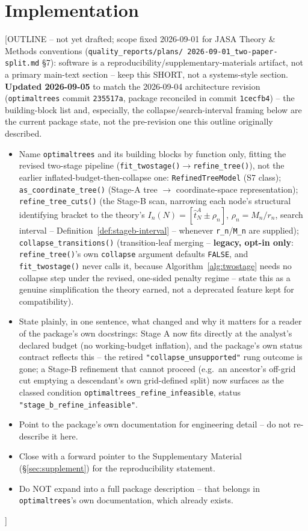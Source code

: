 \documentclass[11pt]{article}
\theoremstyle{plain}
\theoremstyle{definition}
\theoremstyle{remark}
\begin{document}
\section{Implementation}\label{sec:implementation}
[OUTLINE -- not yet drafted; scope fixed 2026-09-01 for JASA Theory \&
Methods conventions (\texttt{quality\_reports/plans/
2026-09-01\_two-paper-split.md} \S7): software is a
reproducibility/supplementary-materials artifact, not a primary main-text
section -- keep this SHORT, not a systems-style section. \textbf{Updated
2026-09-05} to match the 2026-09-04 architecture revision
(\texttt{optimaltrees} commit \texttt{235517a}, package reconciled in
commit \texttt{1cecfb4}) -- the building-block list and, especially, the
collapse/search-interval framing below are the current package state, not
the pre-revision one this outline originally described.
\begin{itemize}
\item Name \texttt{optimaltrees} and its building blocks by function only,
  fitting the revised two-stage pipeline
  (\texttt{fit\_twostage()}$\to$\texttt{refine\_tree()}), not the earlier
  inflated-budget-then-collapse one: \texttt{RefinedTreeModel} (S7 class);
  \texttt{as\_coordinate\_tree()} (Stage-A tree $\to$ coordinate-space
  representation); \texttt{refine\_tree\_cuts()} (the Stage-B scan,
  narrowing each node's structural identifying bracket to the theory's
  $I_n(N)=[\hat t^A_N\pm\rho_n]$, $\rho_n=M_n/r_n$, search interval --
  Definition~\ref{def:stageb-interval} -- whenever \texttt{r\_n}/\texttt{M\_n}
  are supplied); \texttt{collapse\_transitions()} (transition-leaf merging
  -- \textbf{legacy, opt-in only}: \texttt{refine\_tree()}'s own
  \texttt{collapse} argument defaults \texttt{FALSE}, and
  \texttt{fit\_twostage()} never calls it, because Algorithm~\ref{alg:twostage}
  needs no collapse step under the revised, one-sided penalty regime --
  state this as a genuine simplification the theory earned, not a
  deprecated feature kept for compatibility).
\item State plainly, in one sentence, what changed and why it matters for
  a reader of the package's own docstrings: Stage A now fits directly at
  the analyst's declared budget (no working-budget inflation), and the
  package's own status contract reflects this -- the retired
  \texttt{"collapse\_unsupported"} rung outcome is gone; a Stage-B
  refinement that cannot proceed (e.g.\ an ancestor's off-grid cut
  emptying a descendant's own grid-defined split) now surfaces as the
  classed condition \texttt{optimaltrees\_refine\_infeasible}, status
  \texttt{"stage\_b\_refine\_infeasible"}.
\item Point to the package's own documentation for engineering detail --
  do not re-describe it here.
\item Close with a forward pointer to the Supplementary Material
  (\S\ref{sec:supplement}) for the reproducibility statement.
\item Do NOT expand into a full package description -- that belongs in
  \texttt{optimaltrees}'s own documentation, which already exists.
\end{itemize}]
\end{document}
